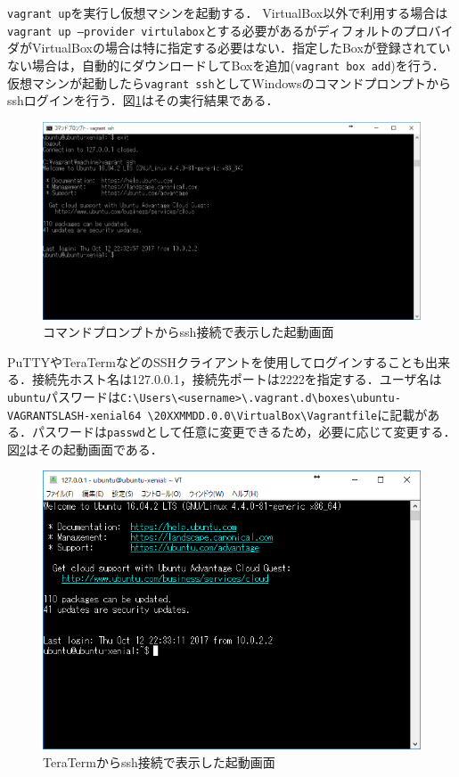\newpage

\texttt{vagrant up}を実行し仮想マシンを起動する．
VirtualBox以外で利用する場合は\texttt{vagrant up --provider virtulabox}とする必要があるがディフォルトのプロバイダがVirtualBoxの場合は特に指定する必要はない．指定したBoxが登録されていない場合は，自動的にダウンロードしてBoxを追加(\texttt{vagrant box add})を行う．\\

仮想マシンが起動したら\texttt{vagrant ssh}としてWindowsのコマンドプロンプトからsshログインを行う．図\ref{cmd}はその実行結果である．

\begin{figure}[htb]
\centering
\includegraphics[width=12cm]{images/vagrant.png}
\caption{コマンドプロンプトからssh接続で表示した起動画面}\label{cmd}
\end{figure}

\newpage

PuTTYやTeraTermなどのSSHクライアントを使用してログインすることも出来る．接続先ホスト名は127.0.0.1，接続先ポートは2222を指定する．ユーザ名は\texttt{ubuntu}パスワードは\texttt{C:\textbackslash Users\textbackslash<username>\textbackslash.vagrant.d\textbackslash boxes\textbackslash ubuntu-VAGRANTSLASH-xenial64
\textbackslash20XXMMDD.0.0\textbackslash VirtualBox\textbackslash Vagrantfile}に記載がある．パスワードは\texttt{passwd}として任意に変更できるため，必要に応じて変更する．図\ref{tera}はその起動画面である．

\begin{figure}[htb]
\centering
\includegraphics[width=12cm]{images/teraterm.png}
\caption{TeraTermからssh接続で表示した起動画面}\label{tera}
\end{figure}

